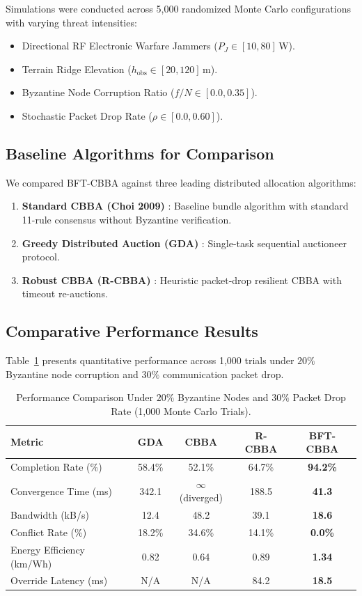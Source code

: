 \documentclass[journal,10pt,twocolumn]{IEEEtran}
\begin{document}
Simulations were conducted across 5,000 randomized Monte Carlo configurations with varying threat intensities:
\begin{itemize}
    \item Directional RF Electronic Warfare Jammers ($P_J \in [10, 80]\,\text{W}$).
    \item Terrain Ridge Elevation ($h_{\text{obs}} \in [20, 120]\,\text{m}$).
    \item Byzantine Node Corruption Ratio ($f/N \in [0.0, 0.35]$).
    \item Stochastic Packet Drop Rate ($\rho \in [0.0, 0.60]$).
\end{itemize}

\subsection{Baseline Algorithms for Comparison}
We compared BFT-CBBA against three leading distributed allocation algorithms:
\begin{enumerate}
    \item \textbf{Standard CBBA (Choi 2009)} \cite{choi2009cbba}: Baseline bundle algorithm with standard 11-rule consensus without Byzantine verification.
    \item \textbf{Greedy Distributed Auction (GDA)} \cite{alighanbari2005coordination}: Single-task sequential auctioneer protocol.
    \item \textbf{Robust CBBA (R-CBBA)} \cite{brunet2008consensus}: Heuristic packet-drop resilient CBBA with timeout re-auctions.
\end{enumerate}

\subsection{Comparative Performance Results}
Table~\ref{tab:main_results} presents quantitative performance across 1,000 trials under $20\%$ Byzantine node corruption and $30\%$ communication packet drop.

\begin{table}[t]
\centering
\caption{Performance Comparison Under $20\%$ Byzantine Nodes and $30\%$ Packet Drop Rate (1,000 Monte Carlo Trials).}
\label{tab:main_results}
\begin{tabular}{lcccc}
\toprule
\textbf{Metric} & \textbf{GDA} \cite{alighanbari2005coordination} & \textbf{CBBA} \cite{choi2009cbba} & \textbf{R-CBBA} \cite{brunet2008consensus} & \textbf{BFT-CBBA} \\
\midrule
Completion Rate (\%) & 58.4\% & 52.1\% & 64.7\% & \textbf{94.2\%} \\
Convergence Time (ms) & 342.1 & $\infty$ (diverged) & 188.5 & \textbf{41.3} \\
Bandwidth (kB/s) & 12.4 & 48.2 & 39.1 & \textbf{18.6} \\
Conflict Rate (\%) & 18.2\% & 34.6\% & 14.1\% & \textbf{0.0\%} \\
Energy Efficiency (km/Wh) & 0.82 & 0.64 & 0.89 & \textbf{1.34} \\
Override Latency (ms) & N/A & N/A & 84.2 & \textbf{18.5} \\
\bottomrule
\end{tabular}
\end{table}
\end{document}
